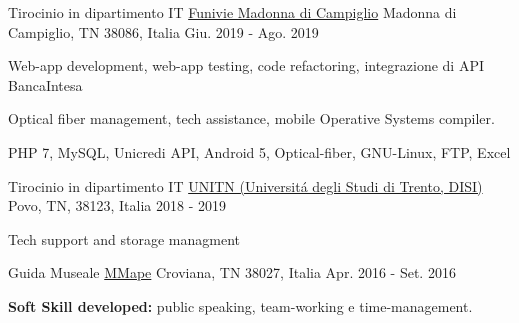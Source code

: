 

\begin{cventries}

  \cventry
    {Tirocinio in dipartimento IT} %
    {\href{https://www.funiviecampiglio.it}{Funivie Madonna di Campiglio}} %
    {Madonna di Campiglio, TN 38086, Italia} %
    {Giu. 2019 - Ago. 2019} %
    {
      \begin{cvitems} %
        \item {Web-app development, web-app testing, code refactoring, integrazione di API BancaIntesa}
        \item {Optical fiber management, tech assistance, mobile Operative Systems compiler.}
        \item {PHP 7, MySQL, Unicredi API, Android 5, Optical-fiber, GNU-Linux, FTP, Excel}
      \end{cvitems}
      }

  \cventry
    {Tirocinio in dipartimento IT} %
    {\href{https://www.disi.unitn.it}{UNITN (Universit\'a degli Studi di Trento, DISI)}} %
    {Povo, TN, 38123, Italia} %
    {2018 - 2019} %
    {
      \begin{cvitems} %
        \item {Tech support and storage managment}
      \end{cvitems}
      }
    

  \cventry
    {Guida Museale} %
    {\href{https://www.mmape.it}{MMape}} %
    {Croviana, TN 38027, Italia} %
    {Apr. 2016 - Set. 2016} %
    {
      \begin{cvitems} %
        \item {\textbf{Soft Skill developed:} public speaking, team-working e time-management.}
      \end{cvitems}
    }


\end{cventries}
